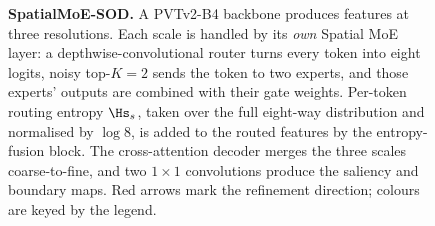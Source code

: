 \begin{figure}[htbp]
{\begin{tikzpicture}[x=1mm,y=1mm, arr/.style={moeflow},
    lane/.style={moeblock, minimum width=31mm, text width=30mm, minimum height=11mm}]
\end{tikzpicture}%
}
\moelegend
\caption{\textbf{SpatialMoE-SOD.}
A PVTv2-B4 backbone produces features at three resolutions.
Each scale is handled by its \emph{own} Spatial MoE layer: a depthwise-convolutional
router turns every token into eight logits, noisy top-$K{=}2$ sends the token to two
experts, and those experts' outputs are combined with their gate weights.
Per-token routing entropy $\Hs_s$, taken over the full eight-way distribution and
normalised by $\log 8$, is added to the routed features by the entropy-fusion block.
The cross-attention decoder merges the three scales coarse-to-fine, and two
$1{\times}1$ convolutions produce the saliency and boundary maps.
Red arrows mark the refinement direction; colours are keyed by the legend.}
\label{fig:arch}
\end{figure}
